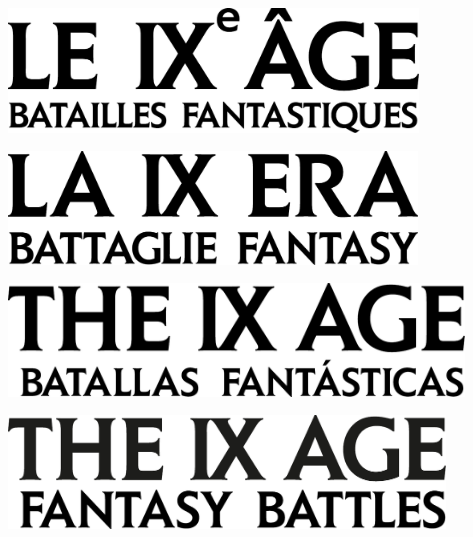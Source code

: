 
\begin{titlepage}
\begin{center}

\ifdef{\booktitle}{}{\newcommand{\booktitle}{Missing title}}
\ifdef{\version}{}{\newcommand{\version}{Missing version}}


\ifdefined\languageisfrench

\begin{center}
\includegraphics[height=3.3cm]{../Layout/pics/BRAND9AgeLogotype_FR.pdf}%
\end{center}

\else
\ifdefined\languageisitalian

\begin{center}
\includegraphics[height=3cm]{../Layout/pics/BRAND9AgeLogotype_IT.pdf}%
\end{center}

\else

\ifdefined\languageisspanish

\begin{center}
\includegraphics[height=3cm]{../Layout/pics/BRAND9AgeLogotype_ES.pdf}%
\end{center}

\else

\begin{center}
\includegraphics[height=3cm]{../Layout/pics/BRAND9AgeLogotype.pdf}%
\end{center}


\end{center}
\end{titlepage}
